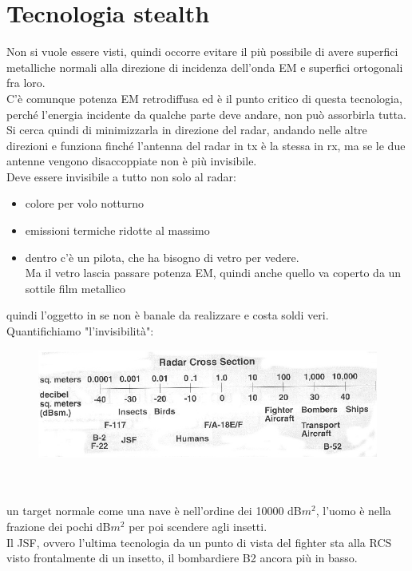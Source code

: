 \documentclass[oneside, 12pt]{extbook}
\begin{document}
\section{Tecnologia stealth}
Non si vuole essere visti, quindi occorre evitare il più possibile di avere superfici metalliche normali alla direzione di incidenza dell'onda EM e superfici ortogonali fra loro.\\
C'è comunque potenza EM retrodiffusa ed è il punto critico di questa tecnologia, perché l'energia incidente da qualche parte deve andare, non può assorbirla tutta.\\
Si cerca quindi di minimizzarla in direzione del radar, andando nelle altre direzioni e funziona finché l'antenna del radar in tx è la stessa in rx, ma se le due antenne vengono disaccoppiate non è più invisibile.\\
Deve essere invisibile a tutto non solo al radar:
\begin{itemize}
	\item colore per volo notturno
	\item emissioni termiche ridotte al massimo
	\item dentro c'è un pilota, che ha bisogno di vetro per vedere.\\
	Ma il vetro lascia passare potenza EM, quindi anche quello va coperto da un sottile film metallico
\end{itemize}
quindi l'oggetto in se non è banale da realizzare e costa soldi veri.\\
Quantifichiamo "l'invisibilità":\\
\begin{figure}[!h]
	\includegraphics[scale=0.6]{immagini/localization/stealths.png}
\end{figure}\\\\
un target normale come una nave è nell'ordine dei 10000 dB$m^2$, l'uomo è nella frazione dei pochi dB$m^2$ per poi scendere agli insetti.\\
Il JSF, ovvero l'ultima tecnologia da un punto di vista del fighter sta alla RCS visto frontalmente di un insetto, il bombardiere B2 ancora più in basso.\\
\end{document}

